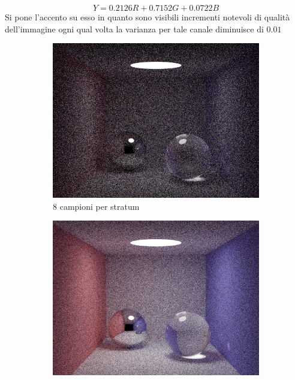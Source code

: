 \begin{equation*}
	Y = 0.2126R+0.7152G+0.0722B
\end{equation*}
Si pone l'accento su esso in quanto sono visibili incrementi notevoli di qualit\`a dell'immagine ogni qual volta la varianza per 
tale canale diminuisce di $0.01$
\begin{figure}[p]
    \begin{subfigure}[c]{0.4\linewidth}
	\centering
	\includegraphics[width=\linewidth]{../assets/appendixD_result_8.png}
	\caption{8 campioni per stratum}
    \end{subfigure}\hspace{12pt}
    \begin{subfigure}[c]{0.4\linewidth}
	\centering
	\includegraphics[width=\linewidth]{../assets/appendixD_result_40.png}

\end{subfigure}
\end{figure}

